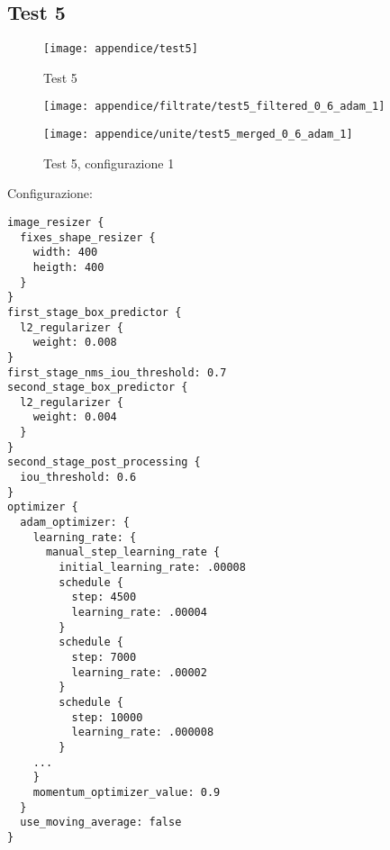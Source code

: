 \newpage
\subsection{Test 5}
\begin{figure}[!ht] 
    \centering
    \texttt{[image: appendice/test5]} 
    \caption{Test 5}
    \label{img:test-1}
\end{figure} 
\newpage



\begin{figure}[H]  
    \begin{minipage}{.5\columnwidth}  
        \centering  
        \texttt{[image: appendice/filtrate/test5\_filtered\_0\_6\_adam\_1]}  
    \end{minipage}%
    \begin{minipage}{0.5\columnwidth}  
        \centering  
        \texttt{[image: appendice/unite/test5\_merged\_0\_6\_adam\_1]}  
    \end{minipage}  
    \caption{Test 5, configurazione 1}
\end{figure}%
Configurazione:
\begin{multicols}{2}
    \begin{lstlisting}
image_resizer {
  fixes_shape_resizer {
    width: 400
    heigth: 400
  }
}
first_stage_box_predictor {
  l2_regularizer {
    weight: 0.008
}
first_stage_nms_iou_threshold: 0.7
second_stage_box_predictor {
  l2_regularizer {
    weight: 0.004
  }
}
second_stage_post_processing {
  iou_threshold: 0.6
}
optimizer {
  adam_optimizer: {
    learning_rate: {
      manual_step_learning_rate {
        initial_learning_rate: .00008
        schedule {
          step: 4500
          learning_rate: .00004
        }
        schedule {
          step: 7000
          learning_rate: .00002
        }
        schedule {
          step: 10000
          learning_rate: .000008
        }
    ...
    }
    momentum_optimizer_value: 0.9
  }
  use_moving_average: false
}
\end{lstlisting}
\end{multicols}

